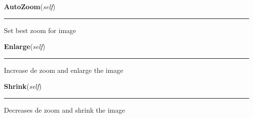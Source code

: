     \label{ImagePanel:ImagePanel:AutoZoom}

    \vspace{0.5ex}

\hspace{.8\funcindent}\begin{boxedminipage}{\funcwidth}

    \raggedright \textbf{AutoZoom}(\textit{self})

    \vspace{-1.5ex}

    \rule{\textwidth}{0.5\fboxrule}
\setlength{\parskip}{2ex}
    Set best zoom for image

\setlength{\parskip}{1ex}
    \end{boxedminipage}

    \label{ImagePanel:ImagePanel:Enlarge}

    \vspace{0.5ex}

\hspace{.8\funcindent}\begin{boxedminipage}{\funcwidth}

    \raggedright \textbf{Enlarge}(\textit{self})

    \vspace{-1.5ex}

    \rule{\textwidth}{0.5\fboxrule}
\setlength{\parskip}{2ex}
    Increase de zoom and enlarge the image

\setlength{\parskip}{1ex}
    \end{boxedminipage}

    \label{ImagePanel:ImagePanel:Shrink}

    \vspace{0.5ex}

\hspace{.8\funcindent}\begin{boxedminipage}{\funcwidth}

    \raggedright \textbf{Shrink}(\textit{self})

    \vspace{-1.5ex}

    \rule{\textwidth}{0.5\fboxrule}
\setlength{\parskip}{2ex}
    Decreases de zoom and shrink the image

\setlength{\parskip}{1ex}
    \end{boxedminipage}

